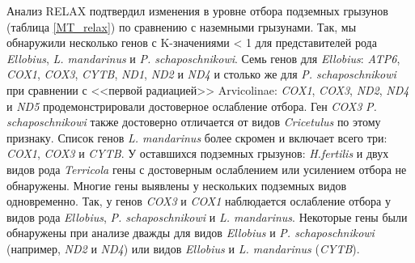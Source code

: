 Анализ RELAX подтвердил изменения в уровне отбора подземных грызунов (таблица \ref{MT_relax}) по сравнению с наземными грызунами. Так, мы обнаружили несколько генов с K-значениями < 1 для представителей рода \textit{Ellobius}, \textit{L. mandarinus} и \textit{P. schaposchnikowi}. Семь генов для \textit{Ellobius}: \textit{ATP6}, \textit{COX1}, \textit{COX3}, \textit{CYTB}, \textit{ND1}, \textit{ND2} и \textit{ND4} и столько же для \textit{P. schaposchnikowi} при сравнении с <<первой радиацией>> Arvicolinae: \textit{COX1}, \textit{COX3}, \textit{ND2}, \textit{ND4} и \textit{ND5} продемонстрировали достоверное ослабление отбора. Ген \textit{COX3} \textit{P. schaposchnikowi} также достоверно отличается от видов \textit{Cricetulus} по этому признаку. Список генов \textit{L. mandarinus} более скромен и включает всего три: \textit{COX1}, \textit{COX3} и \textit{CYTB}. У оставшихся подземных грызунов: \textit{H.fertilis} и двух видов рода \textit{Terricola} гены с достоверным ослаблением или усилением отбора не обнаружены.
Многие гены выявлены у нескольких подземных видов одновременно. Так, у генов \textit{COX3} и \textit{COX1} наблюдается ослабление отбора у видов рода \textit{Ellobius}, \textit{P. schaposchnikowi} и \textit{L. mandarinus}. Некоторые гены были обнаружены при анализе дважды для видов \textit{Ellobius} и \textit{P. schaposchnikowi} (например, \textit{ND2} и \textit{ND4}) или видов \textit{Ellobius} и \textit{L. mandarinus} (\textit{CYTB}).



